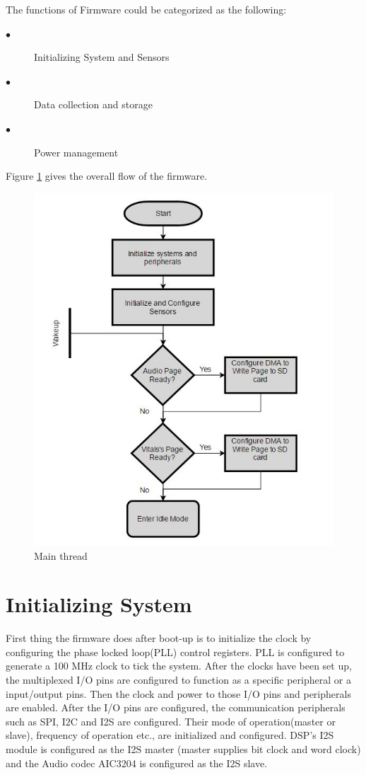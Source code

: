 The functions of Firmware could be categorized as the following:
 \begin{description}
 	\item[$\bullet$]
Initializing System and Sensors 
 	\item[$\bullet$]
Data collection and storage
 	\item[$\bullet$]  
Power management 
 \end{description}
Figure \ref{main} gives the overall flow of the firmware.
 \begin{figure}[h]
	\centering
	\includegraphics[scale = 1 ]{main.JPG}
	\caption{Main thread\label{main}}
\end{figure}

\section{Initializing System}
First thing the firmware does after boot-up is to initialize the clock by configuring the phase locked loop(PLL) control registers. PLL is configured to generate a 100 MHz clock to tick the system. After the clocks have been set up, the multiplexed I/O pins are configured to function as a specific peripheral or a input/output pins. Then the clock and power to those I/O pins and peripherals are enabled. After the I/O pins are configured, the communication peripherals such as SPI, I2C and I2S are configured. Their mode of operation(master or slave), frequency of operation etc., are initialized and configured. DSP's I2S module is configured as the I2S master (master supplies bit clock and word clock) and the Audio codec AIC3204 is configured as the I2S slave. 

